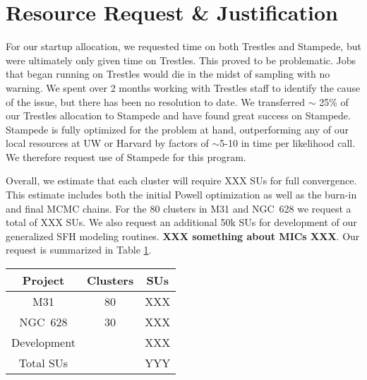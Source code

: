 \documentclass[11pt,preprint]{aastex}
\begin{document}




\section{Resource Request \& Justification}

For our startup allocation, we requested time on both Trestles and Stampede, but were ultimately only given time on Trestles.  This proved to be problematic.  Jobs that began running on Trestles would die in the midst of sampling with no warning.  We spent over 2 months working with Trestles staff to identify the cause of the issue, but there has been no resolution to date.  We transferred $\sim$ 25\% of our Trestles allocation to Stampede and have found great success on Stampede.  Stampede is fully optimized for the problem at hand, outperforming any of our local resources at UW or Harvard by factors of $\sim$5-10 in time per likelihood call.  We therefore request use of Stampede for this program.

Overall, we estimate that each cluster will require XXX SUs for full convergence.  This estimate includes both the initial Powell optimization as well as the burn-in and final MCMC chains.  For the 80 clusters in M31 and NGC~628 we request a total of XXX SUs.  We also request an additional 50k SUs for development of our generalized SFH modeling routines.  \textbf{XXX something about MICs XXX}.  Our request is summarized in Table \ref{tab1}.

\begin{table}[h!]
\begin{center}
\begin{tabular}{cc|c}
Project & Clusters & SUs \\
\hline
M31 & 80 & XXX \\
NGC~628 & 30 & XXX \\
Development & & XXX \\
\hline Total SUs & & YYY \\
\hline

\end{tabular}
\end{center}
\label{tab1}
\end{table}%
\end{document}
